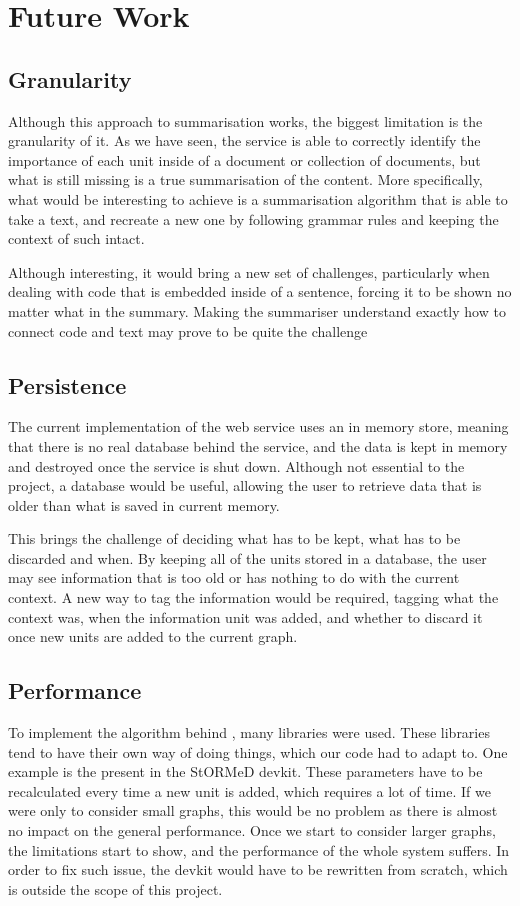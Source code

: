 \section{Future Work}\label{sec:implementationIssues}
\subsection{Granularity}
Although this approach to summarisation works, the biggest limitation is the granularity of it. As we have seen, the service is able to correctly identify the importance of each unit inside of a document or collection of documents, but what is still missing is a true summarisation of the content. More specifically, what would be interesting to achieve is a summarisation algorithm that is able to take a text, and recreate a new one by following grammar rules and keeping the context of such intact.

Although interesting, it would bring a new set of challenges, particularly when dealing with code that is embedded inside of a sentence, forcing it to be shown no matter what in the summary. Making the summariser understand exactly how to connect code and text may prove to be quite the challenge

\subsection{Persistence}
The current implementation of the web service uses an in memory store, meaning that there is no real database behind the service, and the data is kept in memory and destroyed once the service is shut down. Although not essential to the project, a database would be useful, allowing the user to retrieve data that is older than what is saved in current memory. 

This brings the challenge of deciding what has to be kept, what has to be discarded and when. By keeping all of the units stored in a database, the user may see information that is too old or has nothing to do with the current context. A new way to tag the information would be required, tagging what the context was, when the information unit was added, and whether to discard it once new units are added to the current graph.

\subsection{Performance}
To implement the algorithm behind \projectName, many libraries were used. These libraries tend to have their own way of doing things, which our code had to adapt to. One example is the  present in the StORMeD devkit. These parameters have to be recalculated every time a new unit is added, which requires a lot of time. If we were only to consider small graphs, this would be no problem as there is almost no impact on the general performance. Once we start to consider larger graphs, the limitations start to show, and the performance of the whole system suffers. In order to fix such issue, the devkit would have to be rewritten from scratch, which is outside the scope of this project. 
